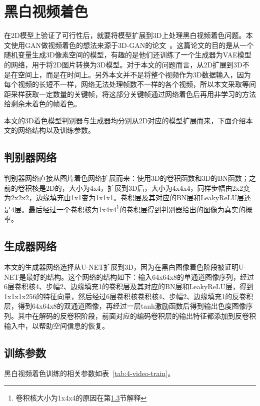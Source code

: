 \chapter{黑白视频着色}
\label{cha:4-video-color}

  在2D模型上验证了可行性后，就要将模型扩展到3D上处理黑白视频着色问题。本文使用GAN做视频着色的想法来源于3D-GAN的论文~\cite{DBLP:conf/nips/0001ZXFT16}。这篇论文的目的是从一个随机变量生成3D像素空间的模型，有趣的是他们还训练了一个生成器为VAE模型的网络，用于将2D图片转换为3D模型。对于本文的问题而言，从2D扩展到3D不是在空间上，而是在时间上。另外本文并不是将整个视频作为3D数据输入，因为每个视频的长短不一样，网络无法处理帧数不一样的各个视频，所以本文采取等间距采样获取一定数量的关键帧，将这部分关键帧通过网络着色后再用非学习的方法给剩余未着色的帧着色。

  本文的3D着色模型判别器与生成器均分别从2D对应的模型扩展而来，下面介绍本文的网络结构以及训练参数。

\section{判别器网络}
\label{sec:4-d-net}
  
  判别器网络直接从图片着色网络扩展而来：使用3D的卷积函数和3D的BN函数；之前的卷积核是2D的，大小为4x4，扩展到3D后，大小为4x4x4，同样步幅由2x2变为2x2x2，边缘填充由1x1变为1x1x1。卷积层及其对应的BN层和LeakyReLU层还是4层。最后经过一个卷积核为1x4x4\footnote{卷积核大小为1x4x4的原因在第\ref{sec:4-train}节解释}的卷积层得到判别器给出的图像为真实的概率。
  
\section{生成器网络}
\label{sec:4-g-net}

  本文的生成器网络选择从U-NET扩展到3D，因为在黑白图像着色阶段被证明U-NET是最好的结构。这个网络的结构如下：输入64x64x8的单通道图像序列，经过6层卷积核4、步幅2、边缘填充1的卷积层及其对应的BN层和LeakyReLU层，得到1x1x1x256的特征向量，然后经过6层卷积核卷积核4、步幅2、边缘填充1的反卷积层，得到64x64x8的双通道图像，再经过一层tanh激励函数后得到输出色度图像序列。其中在解码的反卷积阶段，前面对应的编码卷积层的输出特征都添加到反卷积输入中，以帮助空间信息的恢复。

\section{训练参数}
\label{sec:4-train}

  黑白视频着色训练的相关参数如表~\ref{tab:4-video-train}。

